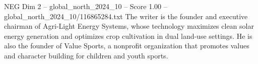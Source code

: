 \begin{textsample}{NEG Dim 2 – global\_north\_2024\_10 – Score 1.00 – global\_north\_2024\_10/116865284.txt}
The writer is the founder and executive chairman of Agri-Light Energy Systems, whose technology maximizes clean solar energy generation and optimizes crop cultivation in dual land-use settings.
He is also the founder of Value Sports, a nonprofit organization that promotes values and character building for children and youth sports.

\end{textsample}
